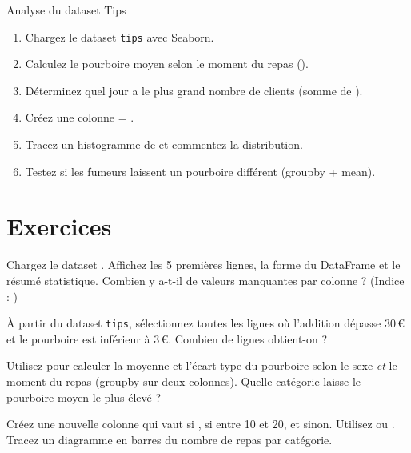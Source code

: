\begin{projet}{Analyse du dataset Tips}
\begin{enumerate}
  \item Chargez le dataset \texttt{tips} avec Seaborn.
  \item Calculez le pourboire moyen selon le moment du repas ().
  \item D\'eterminez quel jour a le plus grand nombre de clients (somme de ).
  \item Cr\'eez une colonne  = .
  \item Tracez un histogramme de  et commentez la distribution.
  \item Testez si les fumeurs laissent un pourboire diff\'erent (groupby + mean).
\end{enumerate}
\end{projet}

\section{Exercices}

\begin{exercice}[$\star$]
Chargez le dataset . Affichez les 5 premi\`eres lignes,
la forme du DataFrame et le r\'esum\'e statistique. Combien y a-t-il de valeurs manquantes
par colonne ? (Indice : )
\end{exercice}

\begin{exercice}[$\star$]
\`A partir du dataset \texttt{tips}, s\'electionnez toutes les lignes o\`u l'addition
d\'epasse 30\,€ et le pourboire est inf\'erieur \`a 3\,€. Combien de lignes obtient-on ?
\end{exercice}

\begin{exercice}[$\star\star$]
Utilisez  pour calculer la moyenne et l'\'ecart-type du pourboire
selon le sexe \emph{et} le moment du repas (groupby sur deux colonnes).
Quelle cat\'egorie laisse le pourboire moyen le plus \'elev\'e ?
\end{exercice}

\begin{exercice}[$\star\star$]
Cr\'eez une nouvelle colonne  qui vaut  si
,  si entre 10 et 20, et  sinon.
Utilisez  ou . Tracez un diagramme en barres du nombre
de repas par cat\'egorie.
\end{exercice}

